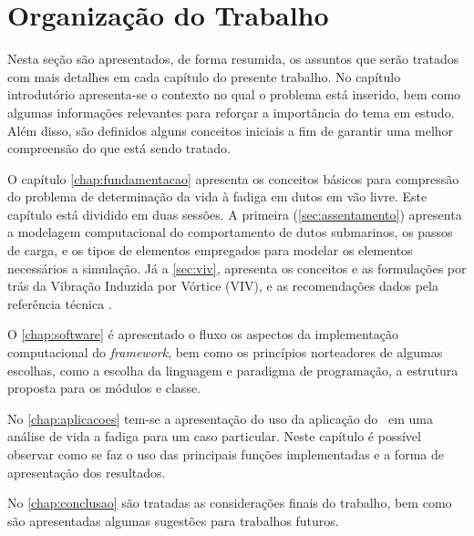 \section{Organização do Trabalho}

Nesta seção são apresentados, de forma resumida, os assuntos que serão tratados com mais detalhes em cada capítulo do presente trabalho. No capítulo introdutório apresenta-se o contexto no qual o problema está inserido, bem como algumas informações relevantes para reforçar a importância do tema em estudo. Além disso, são definidos alguns conceitos iniciais a fim de garantir uma melhor compreensão do que está sendo tratado.

O capítulo \ref{chap:fundamentacao} apresenta os conceitos básicos para compressão do problema de determinação da vida à fadiga em dutos em vão livre. Este capítulo está dividido em duas sessões. A primeira (\autoref{sec:assentamento}) apresenta a modelagem computacional do comportamento de dutos submarinos, os passos de carga, e os tipos de elementos empregados para modelar os elementos necessários a simulação. Já a \autoref{sec:viv}, apresenta os conceitos e as formulações por trás da Vibração Induzida por Vórtice (VIV), e as recomendações dados pela referência técnica .

O \autoref{chap:software} é apresentado o fluxo  os aspectos da implementação computacional do \textit{framework}, bem como os princípios norteadores de algumas escolhas, como a escolha da linguagem e paradigma de programação, a estrutura proposta para os módulos e classe.

No \autoref{chap:aplicacoes} tem-se a apresentação do uso da aplicação do \frame\ em uma análise de vida a fadiga para um caso particular. Neste capítulo é possível observar como se faz o uso das principais funções implementadas e a forma de apresentação dos resultados.

No \autoref{chap:conclusao} são tratadas as considerações finais do trabalho, bem como são apresentadas algumas sugestões para trabalhos futuros.
